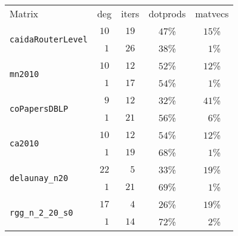 \begin{tabular}{l|c|c|c|c}
\hline
\multirow{2}{*}{Matrix} & \multirow{2}{*}{deg} & \multirow{2}{*}{iters} & \multirow{2}{*}{dotprods} & \multirow{2}{*}{matvecs} \\
 & & & & \\\hline
\hline
\multirow{2}{*}{\texttt{caidaRouterLevel}} & $10$ & $19$ & $47$\% & $15$\%\\
  & $\phantom{0}1$ & $26$ & $38$\% & $\phantom{0}1$\%\\\hline
\multirow{2}{*}{\texttt{mn2010}} & $10$ & $12$ & $52$\% & $12$\%\\
  & $\phantom{0}1$ & $17$ & $54$\% & $\phantom{0}1$\%\\\hline
\multirow{2}{*}{\texttt{coPapersDBLP}} & $\phantom{0}9$ & $12$ & $32$\% & $41$\%\\
  & $\phantom{0}1$ & $21$ & $56$\% & $\phantom{0}6$\%\\\hline
\multirow{2}{*}{\texttt{ca2010}} & $10$ & $12$ & $54$\% & $12$\%\\
  & $\phantom{0}1$ & $19$ & $68$\% & $\phantom{0}1$\%\\\hline
\multirow{2}{*}{\texttt{delaunay\_n20}} & $22$ & $\phantom{0}5$ & $33$\% & $19$\%\\
  & $\phantom{0}1$ & $21$ & $69$\% & $\phantom{0}1$\%\\\hline
\multirow{2}{*}{\texttt{rgg\_n\_2\_20\_s0}} & $17$ & $\phantom{0}4$ & $26$\% & $19$\%\\
  & $\phantom{0}1$ & $14$ & $72$\% & $\phantom{0}2$\%\\\hline
\end{tabular}